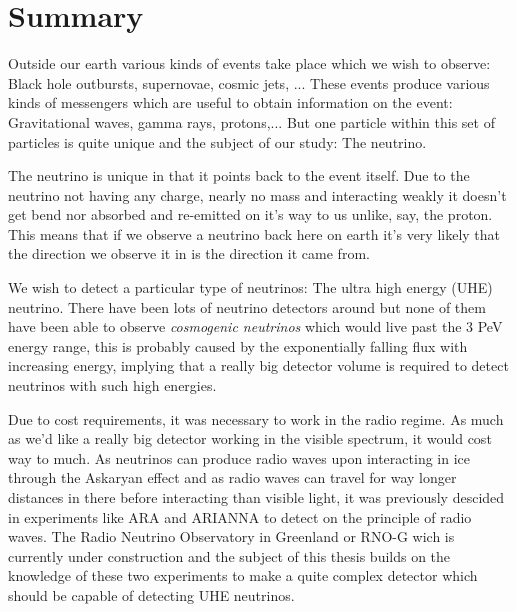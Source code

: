 \documentclass[11pt,a4paper,faculty=we,language=en,doctype=report]{cls/ugent-doc}
\renewcommand{\ULthickness}{2pt} %
\begin{document}

\maketitle
\renewcommand{\ULthickness}{1pt}

\shipout\null
\newpage
\chapter*{Summary}
Outside our earth various kinds of events take place which we wish to 
observe: Black hole outbursts, supernovae, cosmic jets, ...
These events produce various kinds of messengers which are useful to obtain
information on the event: Gravitational waves, gamma rays, protons,...
But one particle within this set of particles is quite unique and
the subject of our study: The neutrino. 

The neutrino is unique in that it points back to the event itself.
Due to the neutrino not having any charge, nearly no mass and 
interacting weakly it doesn't get bend nor absorbed and re-emitted 
on it's way to us unlike, say, the proton. This means that if we observe
a neutrino back here on earth it's very likely that the direction we observe
it in is the direction it came from.

We wish to detect a particular type of neutrinos: The ultra high energy (UHE)
neutrino.  There have been lots of neutrino detectors around but none of them
have been able to observe \textit{cosmogenic neutrinos} which would live past
the 3 PeV energy range, this is probably caused by the exponentially falling
flux with increasing energy, implying that a really big detector volume is
required to detect neutrinos with such high energies. 

Due to cost requirements, it was necessary to work in the radio regime.  As
much as we'd like a really big detector working in the visible spectrum, it
would cost way to much. As neutrinos can produce radio waves upon interacting
in ice through the Askaryan effect and as radio waves can travel for way longer
distances in there before interacting than visible light, it was previously
descided in experiments like ARA and ARIANNA to detect on the principle of
radio waves. The Radio Neutrino Observatory in Greenland or RNO-G wich is
currently under construction and the subject of this thesis builds on the
knowledge of these two experiments to make a quite complex detector which
should be capable of detecting UHE neutrinos.
\end{document}
